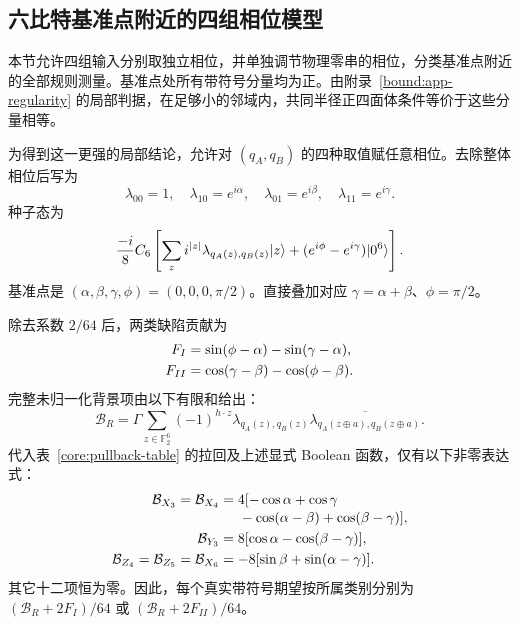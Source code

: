 \subsection{六比特基准点附近的四组相位模型}
\label{embed:app-six-local}

本节允许四组输入分别取独立相位，并单独调节物理零串的相位，分类基准点附近的全部规则测量。基准点处所有带符号分量均为正。由附录~\ref{bound:app-regularity} 的局部判据，在足够小的邻域内，共同半径正四面体条件等价于这些分量相等。

为得到这一更强的局部结论，允许对 $(q_A,q_B)$ 的四种取值赋任意相位。去除整体相位后写为
\begin{equation}
 \lambda_{00}=1,\quad\lambda_{10}=e^{i\alpha},\quad
 \lambda_{01}=e^{i\beta},\quad\lambda_{11}=e^{i\gamma}.
 \label{embed:colors}
\end{equation}
种子态为
\begin{equation}
 \frac{-i}{8}C_6\left[\sum_z i^{|z|}\lambda_{q_A(z),q_B(z)}\lvert z\rangle
 +(e^{i\phi}-e^{i\gamma})\lvert 0^6\rangle\right].
 \label{embed:color-seed}
\end{equation}
基准点是 $(\alpha,\beta,\gamma,\phi)=(0,0,0,\pi/2)$。直接叠加对应 $\gamma=\alpha+\beta$、$\phi=\pi/2$。

除去系数 $2/64$ 后，两类缺陷贡献为
\begin{align}
 F_I&=\sin(\phi-\alpha)-\sin(\gamma-\alpha),\notag\\
 F_{II}&=\cos(\gamma-\beta)-\cos(\phi-\beta).
 \label{embed:color-defect}
\end{align}
完整未归一化背景项由以下有限和给出：
\begin{equation}
 \mathcal B_R=\Gamma\sum_{z\in\mathbb F_2^6}(-1)^{h\cdot z}
 \lambda_{q_A(z),q_B(z)}
 \overline{\lambda_{q_A(z\oplus a),q_B(z\oplus a)}}.
 \label{embed:color-sum}
\end{equation}
代入表~\ref{core:pullback-table} 的拉回及上述显式 Boolean 函数，仅有以下非零表达式：
\begin{align}
 \mathcal B_{X_3}=\mathcal B_{X_4}
 &=4[-\cos\alpha+\cos\gamma\notag\\[-2pt]
 &\hspace{1.4em}-\cos(\alpha-\beta)+\cos(\beta-\gamma)],\notag\\
 \mathcal B_{Y_3}&=8[\cos\alpha-\cos(\beta-\gamma)],\notag\\
 \mathcal B_{Z_4}=\mathcal B_{Z_5}=\mathcal B_{X_6}
 &=-8[\sin\beta+\sin(\alpha-\gamma)].
 \label{embed:color-backgrounds}
\end{align}
其它十二项恒为零。因此，每个真实带符号期望按所属类别分别为 $(\mathcal B_R+2F_I)/64$ 或 $(\mathcal B_R+2F_{II})/64$。

